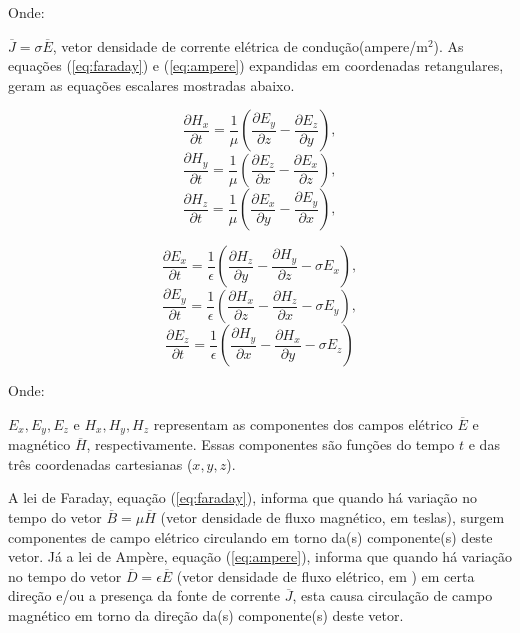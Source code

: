\begin{flushleft}
Onde:
\end{flushleft}

	$\overline{J} = \sigma\overline{E}$, vetor densidade de corrente elétrica  de condução(ampere/m$^{2}$). As equações (\ref{eq:faraday}) e (\ref{eq:ampere}) expandidas em coordenadas retangulares, geram as equações escalares mostradas abaixo.

\begin{equation}\label{eq:hx}
	\frac{\partial H_x}{\partial t} = \frac{1}{\mu}(\frac{\partial E_y}{\partial z}-\frac{\partial E_z}{\partial y}),
\end{equation}
\begin{equation}
	\frac{\partial H_y}{\partial t} = \frac{1}{\mu}(\frac{\partial E_z}{\partial x}-\frac{\partial E_x}{\partial z}),
\end{equation}
\begin{equation}
	\frac{\partial H_z}{\partial t} = \frac{1}{\mu}(\frac{\partial E_x}{\partial y}-\frac{\partial E_y}{\partial x}),
\end{equation}

\begin{equation}
	\frac{\partial E_x}{\partial t} = \frac{1}{\epsilon}(\frac{\partial H_z}{\partial y}-\frac{\partial H_y}{\partial z} -\sigma E_x),
\end{equation}
\begin{equation}
	\frac{\partial E_y}{\partial t} = \frac{1}{\epsilon}(\frac{\partial H_x}{\partial z}-\frac{\partial H_z}{\partial x} -\sigma E_y),
\end{equation}
\begin{equation}\label{eq:ez}
	\frac{\partial E_z}{\partial t} = \frac{1}{\epsilon}(\frac{\partial H_y}{\partial x}-\frac{\partial H_x}{\partial y} -\sigma E_z)
\end{equation}

\begin{flushleft}
Onde:
\end{flushleft}

	$E_x, E_y, E_z$ e $H_x, H_y, H_z$ representam as componentes dos campos elétrico $\overline{E}$ e magnético $\overline{H}$, respectivamente. Essas componentes são funções do tempo $t$ e das três coordenadas cartesianas ($x,y,z$).

	A lei de Faraday, equação (\ref{eq:faraday}), informa que quando há variação no tempo do vetor $\overline{B}=\mu\overline{H}$ (vetor densidade de fluxo magnético, em teslas), surgem componentes de campo elétrico circulando em torno da(s) componente(s) deste vetor. Já a lei de Ampère, equação (\ref{eq:ampere}), informa que quando há variação no tempo do vetor $\overline{D}=\epsilon\overline{E}$ (vetor densidade de fluxo elétrico, em ) em certa direção e/ou a presença da fonte de corrente $\overline{J}$, esta causa circulação de campo magnético em torno da direção da(s) componente(s) deste vetor.

